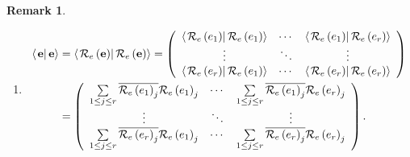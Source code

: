 \documentclass[aps,preprint]{revtex4}%
\newtheorem{remark}[theorem]{Remark}
\begin{document}
\begin{remark}
\begin{enumerate}
\item
\begin{align}
\left\langle \left.  \mathbf{e}\right\vert \mathbf{e}\right\rangle  &
=\left\langle \left.  \mathcal{R}_{e}\left(  \mathbf{e}\right)  \right\vert
\mathcal{R}_{e}\left(  \mathbf{e}\right)  \right\rangle =\left(
\begin{array}
[c]{ccc}%
\left\langle \left.  \mathcal{R}_{e}\left(  e_{1}\right)  \right\vert
\mathcal{R}_{e}\left(  e_{1}\right)  \right\rangle  & \cdots & \left\langle
\left.  \mathcal{R}_{e}\left(  e_{1}\right)  \right\vert \mathcal{R}%
_{e}\left(  e_{r}\right)  \right\rangle \\
\vdots & \ddots & \vdots\\
\left\langle \left.  \mathcal{R}_{e}\left(  e_{r}\right)  \right\vert
\mathcal{R}_{e}\left(  e_{1}\right)  \right\rangle  & \cdots & \left\langle
\left.  \mathcal{R}_{e}\left(  e_{r}\right)  \right\vert \mathcal{R}%
_{e}\left(  e_{r}\right)  \right\rangle
\end{array}
\right) \\
&  =\left(
\begin{array}
[c]{ccc}%
\sum\limits_{1\leq j\leq r}\overline{\mathcal{R}_{e}\left(  e_{1}\right)
_{j}}\mathcal{R}_{e}\left(  e_{1}\right)  _{j} & \cdots & \sum\limits_{1\leq
j\leq r}\overline{\mathcal{R}_{e}\left(  e_{1}\right)  _{j}}\mathcal{R}%
_{e}\left(  e_{r}\right)  _{j}\\
\vdots & \ddots & \vdots\\
\sum\limits_{1\leq j\leq r}\overline{\mathcal{R}_{e}\left(  e_{r}\right)
_{j}}\mathcal{R}_{e}\left(  e_{1}\right)  _{j} & \cdots & \sum\limits_{1\leq
j\leq r}\overline{\mathcal{R}_{e}\left(  e_{r}\right)  _{j}}\mathcal{R}%
_{e}\left(  e_{r}\right)  _{j}%
\end{array}
\right)  .
\end{align}



\end{enumerate}
\end{remark}
\end{document}
